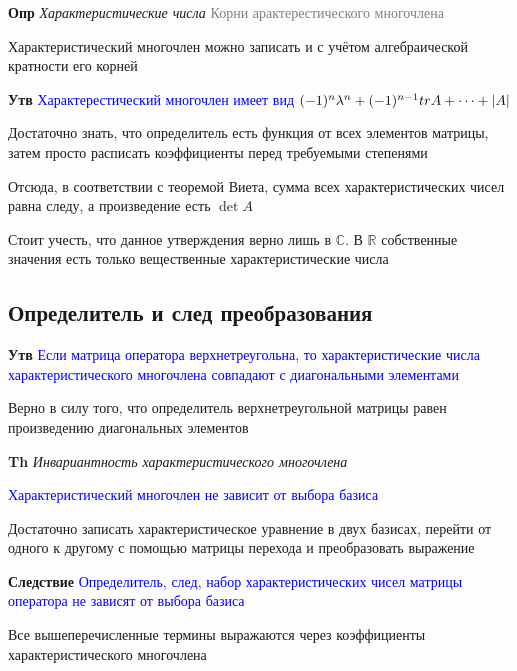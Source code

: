 \textbf{Опр} \textit{Характеристические числа} \textcolor{gray}{Корни арактерестического многочлена}

Характеристический многочлен можно записать и с учётом алгебраической кратности его корней

\textbf{Утв} \textcolor{blue}{Характерестический многочлен имеет
вид $(-1)^n \lambda^n + (-1)^{n-1} tr A + \dots + \abs{A}$}

Достаточно знать, что определитель есть функция от всех элементов матрицы, затем просто расписать коэффициенты
перед требуемыми степенями

Отсюда, в соответствии с теоремой Виета, сумма всех характеристических чисел равна следу, а произведение есть $\det A$

Стоит учесть, что данное утверждения верно лишь в $\mathbb{C}$.
В $\mathbb{R}$ собственные значения есть только вещественные характеристические числа

\subsection{Определитель и след преобразования}

\textbf{Утв} \textcolor{blue}{Если матрица оператора верхнетреугольна, то характеристические числа
характеристического многочлена совпадают с диагональными элементами}

Верно в силу того, что определитель верхнетреугольной матрицы равен произведению диагональных элементов

\textbf{Th} \textit{Инвариантность характеристического многочлена}

\textcolor{blue}{Характеристический многочлен не зависит от выбора базиса}

Достаточно записать характеристическое уравнение в двух базисах, перейти от одного к другому с помощью матрицы
перехода и преобразовать выражение

\textbf{Следствие} \textcolor{blue}{Определитель, след, набор характеристических чисел матрицы оператора не
зависят от выбора базиса}

Все вышеперечисленные термины выражаются через коэффициенты характеристического многочлена